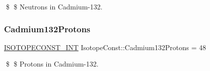 \$ \$ Neutrons in Cadmium-\/132. \mbox{\label{group___isotope_const-_cadmium-_cd132_ga712fabee8538dc2a572361d2f995a6b7}} 
\subsubsection{\texorpdfstring{Cadmium132\+Protons}{Cadmium132Protons}}
{\footnotesize\ttfamily \mbox{\hyperlink{group___isotope_const-_macros_ga5f18360b3e99483a35c32d789e62621c}{I\+S\+O\+T\+O\+P\+E\+C\+O\+N\+S\+T\+\_\+\+I\+NT}} Isotope\+Const\+::\+Cadmium132\+Protons = 48}

\$ \$ Protons in Cadmium-\/132. 